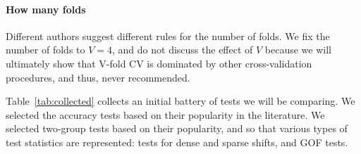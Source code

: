 \documentclass[]{bio}
\begin{document}
\paragraph{How many folds}
Different authors suggest different rules for the number of folds. 
We fix the number of folds to $V=4$, and do not discuss the effect of $V$ because we will ultimately show that V-fold CV is dominated by other cross-validation procedures, and thus, never recommended. 

\bigskip

Table~\ref{tab:collected} collects an initial battery of tests we will be comparing. 
We selected the accuracy tests based on their popularity in the literature.
We selected two-group tests based on their popularity, and so that various types of test statistics are represented: tests for dense and sparse shifts, and GOF tests. 
\end{document}

